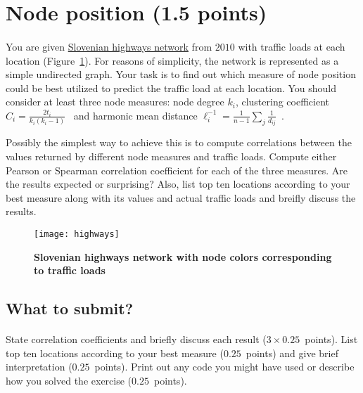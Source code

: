 \documentclass[11pt,a4paper]{article}
\newcommand{\points}[1]{({\color{magenta}$#1$~points})}
\newcommand{\totals}[1]{({\color{magenta}#1 points})}
\newcommand{\figref}[1]{{\color{LimeGreen}Figure~\ref{fig:#1}}}
\begin{document}
\section{Node position \totals{1.5}}

\paragraph{} You are given \href{http://lovro.lpt.fri.uni-lj.si/ina/highways}{Slovenian highways network} from $2010$ with traffic loads at each location (\figref{highways}). For reasons of simplicity, the network is represented as a simple undirected graph. Your task is to find out which measure of node position could be best utilized to predict the traffic load at each location. You should consider at least three node measures: node degree $k_i$, clustering coefficient $C_i=\frac{2t_i}{k_i(k_i-1)}$~\cite{WS98} and harmonic mean distance $\ell_i^{-1}=\frac{1}{n - 1}\sum_j\frac{1}{d_{ij}}$~\cite{New10}. 

Possibly the simplest way to achieve this is to compute correlations between the values returned by different node measures and traffic loads. Compute either Pearson or Spearman correlation coefficient for each of the three measures. Are the results expected or surprising? Also, list top ten locations according to your best measure along with its values and actual traffic loads and breifly discuss the results.

\begin{figure}[t] \centering
	\texttt{[image: highways]}
	\caption{{\bf Slovenian highways network with node colors corresponding to traffic loads}}
	\label{fig:highways}
\end{figure}

\subsection*{What to submit?}

\paragraph{} State correlation coefficients and briefly discuss each result \points{3\times 0.25}. List top ten locations according to your best measure \points{0.25} and give brief interpretation \points{0.25}. Print out any code you might have used or describe how you solved the exercise \points{0.25}.



\end{document}
